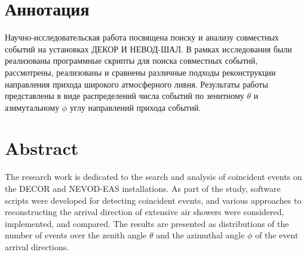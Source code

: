 \section*{Аннотация}
\label{ch:intro_ru}
	Научно-исследовательская работа посвящена поиску и анализу совместных событий на установках ДЕКОР И НЕВОД-ШАЛ. В рамках исследования были реализованы программные скрипты для поиска совместных событий, рассмотрены, реализованы и сравнены различные подходы реконструкции направления прихода широкого атмосферного ливня. 
	Результаты работы представлены в виде распределений числа событий по зенитному \(\theta\) и азимутальному \(\phi\) углу направлений прихода событий.
    
\section*{Abstract}
\label{ch:intro_en}
The research work is dedicated to the search and analysis of coincident events on the DECOR and NEVOD-EAS installations. As part of the study, software scripts were developed for detecting coincident events, and various approaches to reconstructing the arrival direction of extensive air showers were considered, implemented, and compared.
The results are presented as distributions of the number of events over the zenith angle \(\theta\) and the azimuthal angle \(\phi\)  of the event arrival directions.


\endinput